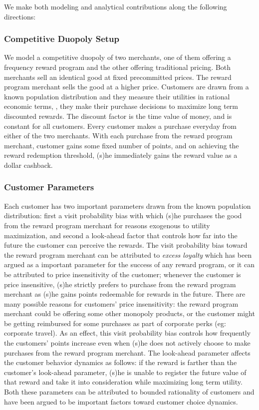 We make both modeling and analytical contributions along the following directions:

\subsubsection{Competitive Duopoly Setup}
We model a competitive duopoly of two merchants, one of them offering a frequency reward program and the other offering traditional pricing.
Both merchants sell an identical good at fixed precommitted prices.
The reward program merchant sells the good at a higher price.
Customers are drawn from a known population distribution and they measure their utilities in rational economic terms, \ie, they make their purchase decisions to maximize long term discounted rewards.
The discount factor is the time value of money, and is constant for all customers.
Every customer makes a purchase everyday from either of the two merchants.
With each purchase from the reward program merchant, customer gains some fixed number of points, and on achieving the reward redemption threshold, (s)he immediately gains the reward value as a dollar cashback.

\subsubsection{Customer Parameters}
Each customer has two important parameters drawn from the known population distribution: first a visit probability bias with which (s)he purchases the good from the reward program merchant for reasons exogenous to utility maximization, and second a look-ahead factor that controls how far into the future the customer can perceive the rewards.
The visit probability bias toward the reward program merchant can be attributed to \emph{excess loyalty} which has been argued as a important parameter for the success of any reward program, or it can be attributed to price insensitivity of the customer; whenever the customer is price insensitive, (s)he strictly prefers to purchase from the reward program merchant as (s)he gains points redeemable for rewards in the future.
There are many possible reasons for customers' price insensitivity: the reward program merchant could be offering some other monopoly products, or the customer might be getting reimbursed for some purchases as part of corporate perks (eg: corporate travel).
As an effect, this visit probability bias controls how frequently the customers' points increase even when (s)he does not actively choose to make purchases from the reward program merchant.
The look-ahead parameter affects the customer behavior dynamics as follows: if the reward is farther than the customer's look-ahead parameter, (s)he is unable to register the future value of that reward and take it into consideration while maximizing long term utility.
Both these parameters can be attributed to bounded rationality of customers and have been argued to be important factors toward customer choice dynamics.


